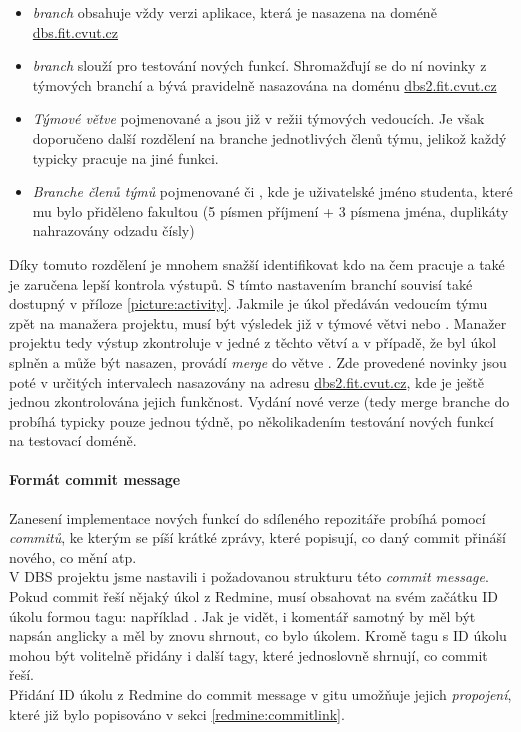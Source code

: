 \begin{itemize}
	\item \emph{ branch} obsahuje vždy verzi aplikace, která je nasazena na doméně \url{dbs.fit.cvut.cz}
	\item \emph{ branch} slouží pro testování nových funkcí. Shromažďují se do ní novinky z týmových branchí a bývá pravidelně nasazována na doménu \url{dbs2.fit.cvut.cz}
	\item \emph{Týmové větve} pojmenované  a  jsou již v režii týmových vedoucích. Je však doporučeno další rozdělení na branche jednotlivých členů týmu, jelikož každý typicky pracuje na jiné funkci.
	\item \emph{Branche členů týmů} pojmenované  či , kde  je uživatelské jméno studenta, které mu bylo přiděleno fakultou (5 písmen příjmení + 3 písmena jména, duplikáty nahrazovány odzadu čísly)
\end{itemize}
Díky tomuto rozdělení je mnohem snažší identifikovat kdo na čem pracuje a také je zaručena lepší kontrola výstupů. S tímto nastavením branchí souvisí také  dostupný v příloze \ref{picture:activity}. Jakmile je úkol předáván vedoucím týmu zpět na manažera projektu, musí být výsledek již v týmové větvi  nebo . Manažer projektu tedy výstup zkontroluje v jedné z těchto větví a v případě, že byl úkol splněn a může být nasazen, provádí \emph{merge} do větve . Zde provedené novinky jsou poté v určitých intervalech nasazovány na adresu \url{dbs2.fit.cvut.cz}, kde je ještě jednou zkontrolována jejich funkčnost. Vydání nové verze (tedy merge branche  do  probíhá typicky pouze jednou týdně, po několikadením testování nových funkcí na testovací doméně.

\paragraph{Formát commit message} \label{version:git:commit}

Zanesení implementace nových funkcí do sdíleného repozitáře probíhá pomocí \emph{commitů}, ke kterým se píší krátké zprávy, které popisují, co daný commit přináší nového, co mění atp.\\
V DBS projektu jsme nastavili i požadovanou strukturu této \emph{commit message}. Pokud commit řeší nějaký úkol z Redmine, musí obsahovat na svém začátku ID úkolu formou tagu: například . Jak je vidět, i komentář samotný by měl být napsán anglicky a měl by znovu shrnout, co bylo úkolem. Kromě tagu s ID úkolu mohou být volitelně přidány i další tagy, které jednoslovně shrnují, co commit řeší.\\
Přidání ID úkolu z Redmine do commit message v gitu umožňuje jejich \emph{propojení}, které již bylo popisováno v sekci \ref{redmine:commitlink}.

